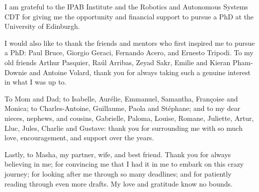 {I am grateful to the IPAB Institute and the Robotics and Autonomous Systems CDT for giving me the opportunity and financial support to pursue a PhD at the University of Edinburgh.

I would also like to thank the friends and mentors who first inspired me to pursue a PhD: Paul Bruce, Giorgio Geraci, Fernando Acero, and Ernesto Tripodi. To my old friends Arthur Pasquier, Raúl Arribas, Zeyad Sakr, Emilie and Kieran Pham-Downie and Antoine Volard, thank you for always taking such a genuine interest in what I was up to.

To Mom and Dad; to Isabelle, Aurélie, Emmanuel, Samantha, Françoise and Monica; to Charles-Antoine, Guillaume, Paola and Stéphane; and to my dear nieces, nephews, and cousins, Gabrielle, Paloma, Louise, Romane, Juliette, Artur, Lluc, Jules, Charlie and Gustave: thank you for surrounding me with so much love, encouragement, and support over the years.

Lastly, to Masha, my partner, wife, and best friend. Thank you for always believing in me; for convincing me that I had it in me to embark on this crazy journey; for looking after me through so many deadlines; and for patiently reading through even more drafts. My love and gratitude know no bounds.
}








